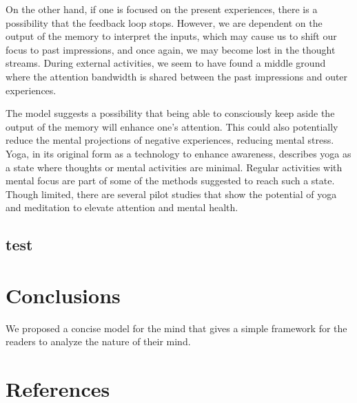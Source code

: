 \documentclass[reprint,amsmath,amssymb,apr,aip,onecolumn, 11pt]{revtex4-1}
\begin{document}
On the other hand, if one is focused on the present experiences, there is a possibility that the feedback loop stops.  However, we are dependent on the output of the memory to interpret the inputs, which may cause us to shift our focus to past impressions, and once again, we may become lost in the thought streams. During external activities, we seem to have found a middle ground where the attention bandwidth is shared between the past impressions and outer experiences. 

The model suggests a possibility that being able to consciously keep aside the output of the memory will enhance one's attention. This could also potentially reduce the mental projections of negative experiences, reducing mental stress. Yoga, in its original form as a technology to enhance awareness, describes yoga as a state where thoughts or mental activities are minimal. Regular activities with mental focus are part of some of the methods suggested to reach such a state\cite{Vivekananda_1896}. Though limited, there are several pilot studies that show the potential of yoga and meditation to elevate attention and mental health\cite{Lazar_2005, Tang_2007, Sadhasivam_2021, Banks_2025}.

\subsection{test}	
	\section{Conclusions}
	We proposed a concise model for the mind that gives a simple framework for the readers to analyze the nature of their mind.  
	
	
	
	
	\section*{References}
	
	
	
	
	
		
	\clearpage
	
	
\end{document}
